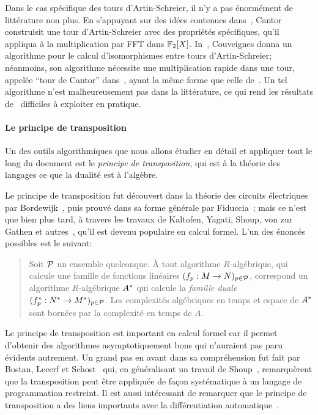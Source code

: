 Dans le cas spécifique des tours d'Artin-Schreier, il n'y a pas
énormément de littérature non plus. En s'appuyant sur des idées
contenues dans~\cite{Conway:ONAG2000}, Cantor~\cite{cantor89}
construisit une tour d'Artin-Schreier avec des propriétés spécifiques,
qu'il appliqua à la multiplication par FFT dans
$\mathbb{F}_2[X]$. In~\cite{couveignes00}, Couveignes donna un algorithme pour
le calcul d'isomorphismes entre tours d'Artin-Schreier; néanmoins, son
algorithme nécessite une multiplication rapide dans une tour, appelée
``tour de Cantor'' dans~\cite{couveignes00}, ayant la même forme que
celle de~\cite{cantor89}. Un tel algorithme n'est malheureusement pas
dans la littérature, ce qui rend les résultats de~\cite{couveignes00}
difficiles à exploiter en pratique.

\paragraph*{Le principe de transposition}
Un des outils algorithmiques que nous allons étudier en détail et
appliquer tout le long du document est le \emph{principe de
  transposition}, qui est à la théorie des langages ce que la dualité
est à l'algèbre.

Le principe de transposition fut découvert dans la théorie des
circuits électri\-ques par Bordewijk~\cite{bordewijk57}, puis prouvé
dans sa forme générale par Fiduccia~\cite{fiduccia:phd}; mais ce n'est
que bien plus tard, à travers les travaux de Kaltofen, Yagati, Shoup,
von zur Gathen et
autres~\cite{kaltofen+lakshman89,vzgathen+shoup92,shoup94,shoup95,shoup99,hanrot+quercia+zimmermann},
qu'il est devenu populaire en calcul formel. L'un des énoncés
possibles est le suivant:
\begin{quote}
  Soit $\mathcal{P}$ un ensemble quelconque. À tout algorithme
  $R$-algébrique, qui calcule une famille de fonctions linéaires
  $(f_p:M\rightarrow N)_{p\in\mathcal{P}}$, correspond un algorithme
  $R$-algébrique $A^\ast$ qui calcule la \emph{famille duale}
  $(f^\ast_p:N^\ast\rightarrow M^\ast)_{p\in\mathcal{P}}$. Les complexités
  algébriques en temps et espace de $A^\ast$ sont bornées par la
  complexité en temps de $A$.
\end{quote}

Le principe de transposition est important en calcul formel car il
permet d'obtenir des algorithmes asymptotiquement bons qui n'auraient
pas paru évi\-dents autrement. Un grand pas en avant dans sa
compréhension fut fait par Bostan, Lecerf et
Schost~\cite{bostan+lecerf+schost:tellegen} qui, en généralisant un
travail de Shoup~\cite{shoup95}, remarquèrent que la transposition
peut être appliquée de façon systématique à un langage de
programmation restreint. Il est aussi intéressant de remarquer que le
principe de transposition a des liens importants avec la
différentiation
automatique~\cite{baur+strassen83,kaltofen+lakshman89,Ka2K,gashkov+gashkov05,sergeev08}.

